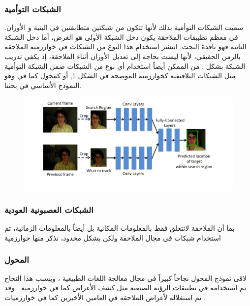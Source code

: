 \subsubsection{الشبكات التوأمية 
}
سميت الشبكات التوأمية بذلك لأنها تتكون من شبكتين متطابقتين في البنية و الأوزان. في معظم تطبيقات الملاحقة يكون دخل الشبكة الأولى هو 
الغرض، أما دخل الشبكة الثانية فهو نافذة البحث. انتشر استخدام هذا النوع من الشبكات في خوارزمية الملاحقة بالزمن الحقيقي، لأنها ليست بحاجة إلى تعديل الأوزان أثناء الملاحقة، إذ يكفي تدريب الشبكة بشكل 
.
من الممكن أيضاً استخدام أي نوع من الشبكات ضمن الشبكة التوأمية مثل الشبكات التلافيفية كخوارزمية 
الموضحة في الشكل 
\ref{fig:GOTURN},
أو كمحول 
كما في 
وهو النموذج الأساسي في بحثنا.
\begin{figure}[h!]
	\centerline{\includegraphics[width=\textwidth]{images/GOTURN}}
	\caption{
		}	
	\label{fig:GOTURN}
\end{figure}
\subsubsection{الشبكات العصبونية العودية
}
بما أن الملاحقة لاتتعلق فقط بالمعلومات المكانية بل أيضاً بالمعلومات الزمانية، تم استخدام شبكات 
في مجال الملاحقة ولكن  بشكل محدود، نذكر منها خوارزمية 

\subsubsection{المحول 
}
لاقى نموذج المحول نجاحاً كبيراً في مجال معالجة اللغات الطبيعية 
،
وبسبب هذا النجاح تم استخدامه في تطبيقات الرؤية الصنعية مثل كشف الأغراض كما في خوارزمية
.
 وقد تم استغلاله لأغراض الملاحقة في العامين الأخيرين كما في خوارزميات 
.

